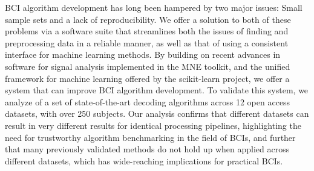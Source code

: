BCI algorithm development has long been hampered by two major issues: Small
sample sets and a lack of reproducibility. We offer a solution to both of these
problems via a software suite that streamlines both the issues of finding and
preprocessing data in a reliable manner, as well as that of using a consistent
interface for machine learning methods. By building on recent advances in
software for signal analysis implemented in the MNE toolkit, and the unified
framework for machine learning offered by the scikit-learn project, we offer a
system that can improve BCI algorithm development. To validate this system, we
analyze of a set of state-of-the-art decoding algorithms across 12 open access
datasets, with over 250 subjects. Our analysis confirms that different datasets
can result in very different results for identical processing pipelines,
highlighting the need for trustworthy algorithm benchmarking in the field of
BCIs, and further that many previously validated methods do not hold up when
applied across different datasets, which has wide-reaching implications for
practical BCIs.

